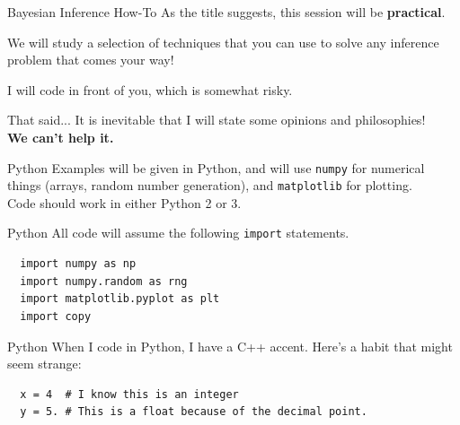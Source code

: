 
\begin{frame}[t,plain]
\titlepage
\end{frame}

\begin{frame}[t]{Bayesian Inference How-To}
As the title suggests, this session will be {\bf practical}.
\vspace{1cm}

We will study a selection of techniques that you can use to solve any
inference problem that comes your way!

I will code in front of you, which is somewhat risky.
\end{frame}

\begin{frame}[t]{That said...}
It is inevitable that I will state some opinions and philosophies!\\
{\bf We can't help it.}
\end{frame}

\begin{frame}[t]{Python}
Examples will be given in Python, and will use {\tt numpy} for numerical
things (arrays, random number generation), and {\tt matplotlib} for plotting.\\
\vspace{1cm}
Code should work in either Python 2 or 3.
\end{frame}

\begin{frame}[t, fragile]{Python}
All code will assume the following {\tt import} statements.
\begin{verbatim}
  import numpy as np
  import numpy.random as rng
  import matplotlib.pyplot as plt
  import copy
\end{verbatim}
\end{frame}


\begin{frame}[t, fragile]{Python}
When I code in Python, I have a C++ accent. Here's a habit that might
seem strange:

\begin{verbatim}
  x = 4  # I know this is an integer
  y = 5. # This is a float because of the decimal point.
\end{verbatim}
\end{frame}


